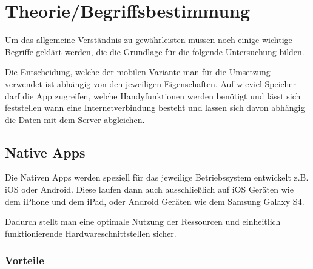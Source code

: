 %
\chapter{Theorie/Begriffsbestimmung}
\label{sec:theorie:Theorie}


Um das allgemeine Verständnis zu gewährleisten müssen noch einige wichtige Begriffe geklärt werden, die die Grundlage für die folgende Untersuchung bilden.

Die Entscheidung, welche der mobilen Variante man für die Umsetzung verwendet ist abhängig von den jeweiligen Eigenschaften. Auf wieviel Speicher darf die App zugreifen, welche Handyfunktionen werden benötigt und lässt sich feststellen wann eine Internetverbindung besteht und lassen sich davon abhängig die Daten mit dem Server abgleichen.

\section{Native Apps}
\label{sec:intro:native}

Die Nativen Apps werden speziell für das jeweilige Betriebssystem entwickelt z.B. iOS oder Android. Diese laufen dann auch ausschließlich auf iOS Geräten wie dem iPhone und dem iPad, oder Android Geräten wie dem Samsung Galaxy S4.\cite[]{WEB:APPEV:2014}

Dadurch stellt man eine optimale Nutzung der Ressourcen und einheitlich funktionierende Hardwareschnittstellen sicher.\cite[]{WEB:APPEV:2014}

\subsection{Vorteile}
\label{sec:native:pros}

